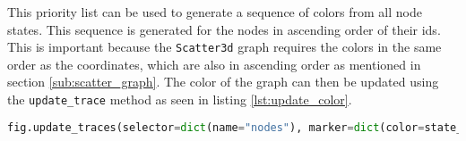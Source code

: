 This priority list can be used to generate a sequence of colors from all node states. This sequence is generated for the nodes in ascending order of their ids. This is important because the \texttt{Scatter3d} graph requires the colors in the same order as the coordinates, which are also in ascending order as mentioned in section \ref{sub:scatter_graph}. The color of the graph can then be updated using the \texttt{update\_trace} method as seen in listing \ref{lst:update_color}.

\begin{lstlisting}[language=python, caption={Updating the colors of the graph}, label={lst:update_color}]
fig.update_traces(selector=dict(name="nodes"), marker=dict(color=state_colors))
\end{lstlisting}